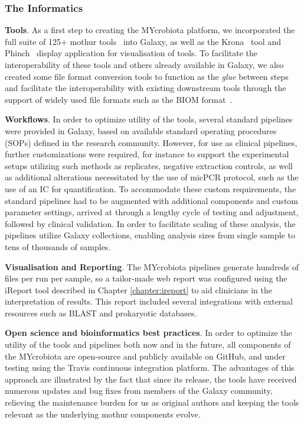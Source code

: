 \subsubsection{The Informatics}

\textbf{Tools}. As a first step to creating the MYcrobiota platform, we incorporated the full suite of 125+ mothur tools~\cite{schloss} into Galaxy, as well as the Krona~\cite{ondov2015krona} tool and Phinch~\cite{bik2014phinch} display application for visualisation of tools. To facilitate the interoperability of these tools and others already available in Galaxy, we also created some file format conversion tools to function as the \emph{glue} between steps and facilitate the interoperability with existing downstream tools through the support of widely used file formats such as the BIOM format~\cite{mcdonald2012biological}.


\textbf{Workflows}. In order to optimize utility of the tools, several standard pipelines were provided in Galaxy, based on available standard operating procedures (SOPs) defined in the research community. However, for use as clinical pipelines, further customizations were required, for instance to support the experimental setups utilizing such methods as replicates, negative extraction controls, as well as additional alterations necessitated by the use of micPCR protocol, such as the use of an IC for quantification. To accommodate these custom requirements, the standard pipelines had to be augmented with additional components and custom parameter settings, arrived at through a lengthy cycle of testing and adjustment, followed by clinical validation. In order to facilitate scaling of these analysis, the pipelines utilize Galaxy collections, enabling analysis sizes from single sample to tens of thousands of samples.

\textbf{Visualisation and Reporting}. The MYcrobiota pipelines generate hundreds of files per run per sample, so a tailor-made web report was configured using the iReport tool described in Chapter \ref{chapter:ireport} to aid clinicians in the interpretation of results. This report included several integrations with external resources such as BLAST and prokaryotic databases.

\textbf{Open science and bioinformatics best practices}. In order to optimize the utility of the tools and pipelines both now and in the future, all components of the MYcrobiota are open-source and publicly available on GitHub, and under testing using the Travis continuous integration platform. The advantages of this approach are illustrated by the fact that since its release, the tools have received numerous updates and bug fixes from members of the Galaxy community, relieving the maintenance burden for us as original authors and keeping the tools relevant as the underlying mothur components evolve.

